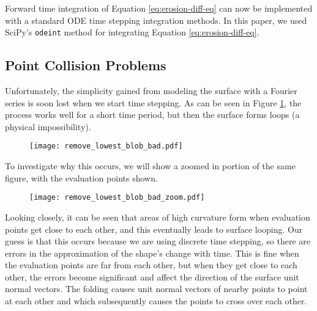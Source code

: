 Forward time integration of Equation \ref{eq:erosion-diff-eq} can now be implemented with a standard ODE time stepping integration methods. In this paper, we used SciPy's {\tt odeint} method for integrating Equation \ref{eq:erosion-diff-eq}.

\subsection*{Point Collision Problems}

Unfortunately, the simplicity gained from modeling the surface with a Fourier series is soon lost when we start time stepping. As can be seen in Figure \ref{fig:remove-lowest-blob-bad}, the process works well for a short time period, but then the surface forms loops (a physical impossibility).

\begin{figure}[H]
    \begin{center}
      \texttt{[image: remove\_lowest\_blob\_bad.pdf]}
    \end{center}
  \vspace{-.2in} %
  \caption{\label{fig:remove-lowest-blob-bad}}
\end{figure}

To investigate why this occurs, we will show a zoomed in portion of the same figure, with the evaluation points shown. 

\begin{figure}[H]
    \begin{center}
      \texttt{[image: remove\_lowest\_blob\_bad\_zoom.pdf]}
    \end{center}
  \vspace{-.2in} %
  \caption{\label{fig:remove-lowest-blog-bad-zoom}}
\end{figure}

Looking closely, it can be seen that areas of high curvature form when evaluation points get close to each other, and this eventually leads to surface looping. Our guess is that this occurs because we are using discrete time stepping, so there are errors in the approximation of the shape's change with time. This is fine when the evaluation points are far from each other, but when they get close to each other, the errors become significant and affect the direction of the surface unit normal vectors. The folding causes unit normal vectors of nearby points to point at each other and which subsequently causes the points to cross over each other.

